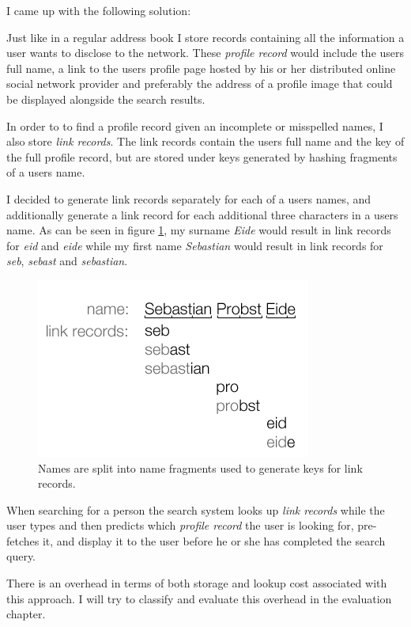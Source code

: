 I came up with the following solution:

Just like in a regular address book I store records containing all the information a user wants to disclose to the network. These \emph{profile record} would include the users full name, a link to the users profile page hosted by his or her distributed online social network provider and preferably the address of a profile image that could be displayed alongside the search results.

In order to to find a profile record given an incomplete or misspelled names, I also store \emph{link records}. The link records contain the users full name and the key of the full profile record, but are stored under keys generated by hashing fragments of a users name. 

I decided to generate link records separately for each of a users names, and additionally generate a link record for each additional three characters in a users name.
As can be seen in figure \ref{figLinkRecord}, my surname \emph{Eide} would result in link records for \emph{eid} and \emph{eide} while my first name \emph{Sebastian} would result in link records for \emph{seb}, \emph{sebast} and \emph{sebastian}.

\begin{figure}[!htb]
\begin{center}
	\includegraphics[width=0.6\linewidth]{illustrations/LinkRecords.png}
  \caption{Names are split into name fragments used to generate keys for link records.}
  \label{figLinkRecord}
\end{center}
\end{figure}

When searching for a person the search system looks up \emph{link records} while the user types and then predicts which \emph{profile record} the user is looking for, pre-fetches it, and display it to the user before he or she has completed the search query.

There is an overhead in terms of both storage and lookup cost associated with this approach. I will try to classify and evaluate this overhead in the evaluation chapter.

